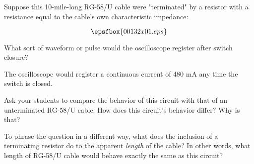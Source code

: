 

Suppose this 10-mile-long RG-58/U cable were "terminated" by a resistor with a resistance equal to the cable's own characteristic impedance:

$$\epsfbox{00132x01.eps}$$

What sort of waveform or pulse would the oscilloscope register after switch closure?







The oscilloscope would register a continuous current of 480 mA any time the switch is closed.







Ask your students to compare the behavior of this circuit with that of an unterminated RG-58/U cable.  How does this circuit's behavior differ?  Why is that?

To phrase the question in a different way, what does the inclusion of a terminating resistor do to the apparent {\it length} of the cable?  In other words, what length of RG-58/U cable would behave exactly the same as this circuit?




